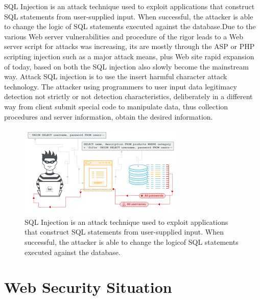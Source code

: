 \documentclass[letterpaper,12pt]{article}
\begin{document}
SQL Injection is an attack technique used to exploit applications that construct SQL statements from user-supplied input. When successful, the attacker is able to change the logic of SQL statements executed against the database.Due to the various Web server vulnerabilities and procedure of the rigor leads to a Web server script for attacks was increasing, its are mostly through the ASP or PHP scripting injection such as a major attack means, plus Web site rapid expansion of today, based on both the SQL injection also slowly become the mainstream way. Attack SQL injection is to use the insert harmful character attack technology. The attacker using programmers to user input data legitimacy detection not strictly or not detection characteristics, deliberately in a different way from client submit special code to manipulate data, thus collection procedures and server information, obtain the desired information.

\begin{figure}[!h]
    \centering
    \includegraphics[width=.8\textwidth]{sqlinjection.png}
    \caption{SQL Injection is an attack technique used to exploit applications that construct SQL statements from user-supplied input.  When successful, the attacker is able to change the logicof SQL statements executed against the database.}
\end{figure}

\section{Web Security Situation}
\end{document}
